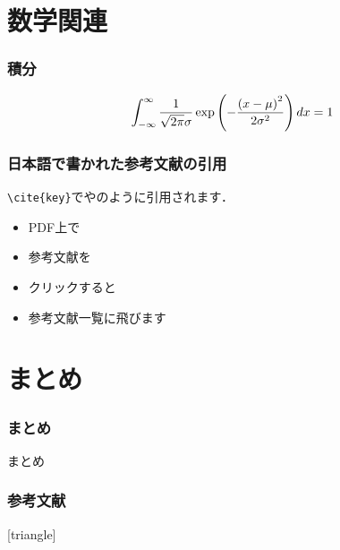 \documentclass[11pt]{beamer}
\let\oldcite=\citet
\renewcommand\citet[1]{\hyperlink{#1}{\oldcite{#1}}}
\begin{document}
\section{数学関連}
\begin{frame}
\frametitle{積分}
\begin{align}
    \int_{-\infty}^\infty \frac{1}{\sqrt{2\pi}\sigma}\exp\left(-\frac{\left(x - \mu\right)^2}{2\sigma^2}\right) dx = 1
\end{align}
\end{frame}

\begin{frame}
\frametitle{日本語で書かれた参考文献の引用}
\texttt{{\textbackslash}cite\{key\}}で\citet{demo}や\citet{japanese}のように引用されます．
    \begin{itemize}
        \item PDF上で
        \item 参考文献を
        \item クリックすると
        \item 参考文献一覧に飛びます
    \end{itemize}
\end{frame}

\section{まとめ}
\begin{frame}
\frametitle{まとめ}
まとめ
\end{frame}

\begin{frame}[allowframebreaks]
\frametitle{参考文献}
\begingroup
\scriptsize
    [triangle]
    
    
\endgroup
\end{frame}
\end{document}
